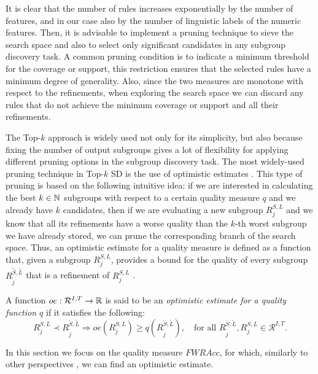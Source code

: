 It is clear that the number of rules increases exponentially by the number of features, and in our case also by the number of linguistic labels of the numeric features. Then, it is advisable to implement a pruning technique to sieve the search space and also to select only significant candidates in any subgroup discovery task. A common pruning condition is to indicate a minimum threshold for the coverage or support, this restriction ensures that the selected rules have a minimum degree of generality. Also, since the two measures are monotone with respect to the refinements, when exploring the search space we can discard any rules that do not achieve the minimum coverage or support and all their refinements.

The Top-$k$ approach is widely used not only for its simplicity, but also because fixing the number of output subgroups gives a lot of flexibility for applying different pruning options in the subgroup discovery task. The most widely-used pruning technique in Top-$k$ SD is the use of optimistic estimates \cite{Wrobel1997}.  This type of pruning is based on the following intuitive idea: if we are interested in calculating the best $k \in \mathbb{N}$ subgroups with respect to a certain quality measure $q$ and we already have $k$ candidates, then if we are evaluating a new subgroup $R^{S,L}_j$ and we know that all its refinements have a worse quality than the $k$-th worst subgroup we have already stored, we can prune the corresponding branch of the search space. Thus,  an optimistic estimate for a quality measure is defined as a function that, given a subgroup $R^{S,L}_j$, provides a bound for the quality of every subgroup $R^{\tilde{S},\tilde{L}}_{\tilde{j}}$ that is a refinement of $R^{S,L}_j$ \cite{Grosskreutz2008}.

\begin{definition}
	A function $oe : \mathcal{R}^{I,T} \to \mathbb{R}$ is said to be an \emph{optimistic estimate for a quality function $q$} if it satisfies the following: 
	$$R^{S,L}_j \prec R^{\tilde{S},\tilde{L}}_{\tilde{j}} \Rightarrow oe(R^{S,L}_j) \geq q(R^{\tilde{S},\tilde{L}}_{\tilde{j}}), \quad \text{for all } R^{\tilde{S},\tilde{L}}_{\tilde{j}}, R^{S,L}_j \in \mathcal{R}^{I,T}.$$
\end{definition}

In this section we focus on the quality measure $FWRAcc$, for which, similarly to other perspectives \cite{Wrobel1997,Grosskreutz2008,Lemmerich2016}, we can find an optimistic estimate.

